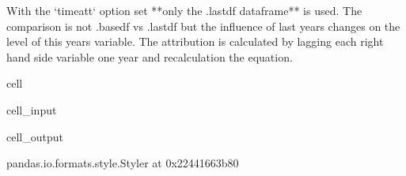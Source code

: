 \documentclass[letterpaper,10pt,english]{jupyterBook}
\begin{document}
\begin{sphinxVerbatim}[commandchars=\\\{\}]
With the `time\PYGZus{}att` option set **only the .lastdf dataframe** is used.   The comparison is not .basedf vs .lastdf but the influence of last year\PYGZsq{}s changes on the level of this year\PYGZsq{}s variable. The attribution is calculated by lagging each right hand side variable one year and recalculation the equation.
\end{sphinxVerbatim}

\begin{sphinxuseclass}{cell}\begin{sphinxVerbatimInput}

\begin{sphinxuseclass}{cell_input}
\begin{sphinxVerbatim}[commandchars=\\\{\}]
  
\end{sphinxVerbatim}

\end{sphinxuseclass}\end{sphinxVerbatimInput}
\begin{sphinxVerbatimOutput}

\begin{sphinxuseclass}{cell_output}
\begin{sphinxVerbatim}[commandchars=\\\{\}]
\PYGZlt{}pandas.io.formats.style.Styler at 0x22441663b80\PYGZgt{}
\end{sphinxVerbatim}

\end{sphinxuseclass}\end{sphinxVerbatimOutput}

\end{sphinxuseclass}
\end{document}
